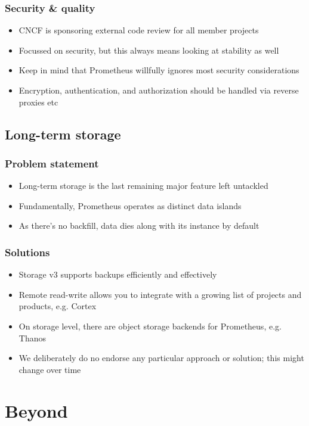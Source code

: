\documentclass[t]{beamer}
\begin{document}
\begin{frame}
	\frametitle{Security \& quality}
	\begin{itemize}
		\item CNCF is sponsoring external code review for all member projects
		\item Focussed on security, but this always means looking at stability as well
		\item Keep in mind that Prometheus willfully ignores most security considerations
		\item Encryption, authentication, and authorization should be handled via reverse proxies etc
	\end{itemize}
\end{frame}


\subsection{Long-term storage}

\begin{frame}
	\frametitle{Problem statement}
	\begin{itemize}
		\item Long-term storage is the last remaining major feature left untackled
		\item Fundamentally, Prometheus operates as distinct data islands
		\item As there's no backfill, data dies along with its instance by default
	\end{itemize}
\end{frame}

\begin{frame}
	\frametitle{Solutions}
	\begin{itemize}
		\item Storage v3 supports backups efficiently and effectively
		\item Remote read-write allows you to integrate with a growing list of projects and products, e.g. Cortex
		\item On storage level, there are object storage backends for Prometheus, e.g. Thanos
		\vfill
		\item We deliberately do no endorse any particular approach or solution; this might change over time
	\end{itemize}
\end{frame}

\section{Beyond}
\end{document}
